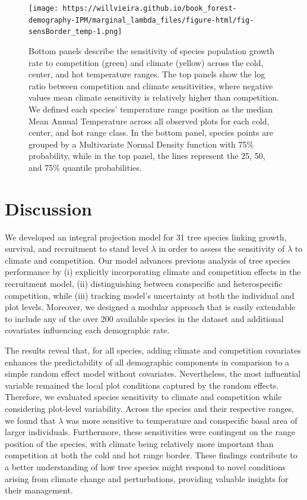 \documentclass[12pt]{article}
\begin{document}
\begin{figure}
\hypertarget{fig:temp_vs_comp}{%
\centering
\texttt{[image: https://willvieira.github.io/book\_forest-demography-IPM/marginal\_lambda\_files/figure-html/fig-sensBorder\_temp-1.png]}
\caption{Bottom panels describe the sensitivity of species population
growth rate to competition (green) and climate (yellow) across the cold,
center, and hot temperature ranges. The top panels show the log ratio
between competition and climate sensitivities, where negative values
mean climate sensitivity is relatively higher than competition. We
defined each species' temperature range position as the median Mean
Annual Temperature across all observed plots for each cold, center, and
hot range class. In the bottom panel, species points are grouped by a
Multivariate Normal Density function with 75\% probability, while in the
top panel, the lines represent the 25, 50, and 75\% quantile
probabilities.}\label{fig:temp_vs_comp}
}
\end{figure}

\hypertarget{discussion}{%
\section{Discussion}\label{discussion}}

We developed an integral projection model for 31 tree species linking
growth, survival, and recruitment to stand level \(\lambda\) in order to
assess the sensitivity of \(\lambda\) to climate and competition. Our
model advances previous analysis of tree species performance by (i)
explicitly incorporating climate and competition effects in the
recruitment model, (ii) distinguishing between conspecific and
heterospecific competition, while (iii) tracking model's uncertainty at
both the individual and plot levels. Moreover, we designed a modular
approach that is easily extendable to include any of the over 200
available species in the dataset and additional covariates influencing
each demographic rate.

The results reveal that, for all species, adding climate and competition
covariates enhances the predictability of all demographic components in
comparison to a simple random effect model without covariates.
Nevertheless, the most influential variable remained the local plot
conditions captured by the random effects. Therefore, we evaluated
species sensitivity to climate and competition while considering
plot-level variability. Across the species and their respective ranges,
we found that \(\lambda\) was more sensitive to temperature and
conspecific basal area of larger individuals. Furthermore, these
sensitivities were contingent on the range position of the species, with
climate being relatively more important than competition at both the
cold and hot range border. These findings contribute to a better
understanding of how tree species might respond to novel conditions
arising from climate change and perturbations, providing valuable
insights for their management.
\end{document}
